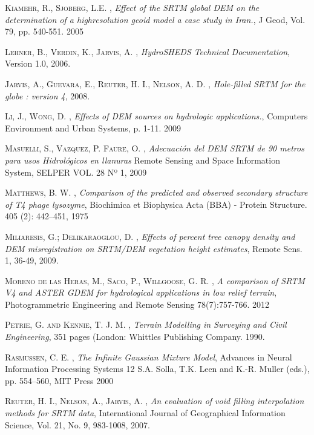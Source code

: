 \begin{thebibliography}{9}
 \textsc{Kiamehr, R., Sjoberg, L.E.} , \textit{Effect of the SRTM global DEM on the determination of a highresolution geoid model a case study in Iran.},  J Geod, Vol. 79, pp. 540-551. 2005

 \textsc{Lehner, B., Verdin, K., Jarvis, A.} , \textit{HydroSHEDS Technical Documentation}, Version 1.0, 2006.

 \textsc{Jarvis, A., Guevara, E., Reuter, H. I., Nelson, A. D.} , \textit{Hole-filled SRTM for the globe : version 4}, 2008.

 \textsc{Li, J., Wong, D.} , \textit{Effects of DEM sources on hydrologic applications.}, Computers Environment and Urban Systems, p. 1-11. 2009

 \textsc{Masuelli, S., Vazquez, P. Faure, O.} , \textit{Adecuación del DEM SRTM de 90 metros para usos Hidrológicos en llanuras} Remote Sensing and Space Information System, SELPER VOL. 28 Nº 1, 2009 

 \textsc{Matthews, B. W.} , \textit{Comparison of the predicted and observed secondary structure of T4 phage lysozyme}, Biochimica et Biophysica Acta (BBA) - Protein Structure. 405 (2): 442–451, 1975

 \textsc{Miliaresis, G.; Delikaraoglou, D.} , \textit{Effects of percent tree canopy density and DEM misregistration on SRTM/DEM vegetation height estimates},  Remote Sens. 1, 36-49, 2009.

 \textsc{Moreno de las Heras, M., Saco, P., Willgoose, G. R.} , \textit{A comparison of SRTM V4 and ASTER GDEM for hydrological applications in low relief terrain}, Photogrammetric Engineering and Remote Sensing 78(7):757-766. 2012

 \textsc{Petrie, G. and Kennie, T. J. M.} , \textit{Terrain Modelling in Surveying and Civil Engineering},  351 pages (London: Whittles Publishing Company. 1990.

 \textsc{Rasmussen, C. E.} , \textit{The Infinite Gaussian Mixture Model}, Advances in Neural Information Processing Systems 12 S.A. Solla, T.K. Leen and K.-R. Muller (eds.), pp. 554–560, MIT Press 2000

 \textsc{Reuter, H. I., Nelson, A., Jarvis, A.} , \textit{An evaluation of void filling interpolation methods for SRTM data}, International Journal of Geographical Information Science, Vol. 21, No. 9, 983-1008, 2007.


\end{thebibliography}
